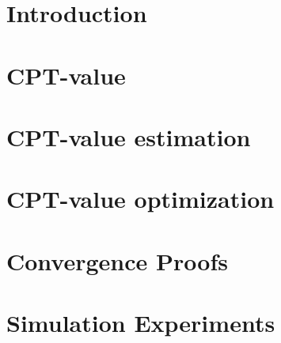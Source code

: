 \documentclass[twocolumn]{IEEEtran}
\begin{document}
\section{Introduction}
\label{sec:introduction}



\section{CPT-value}
\label{sec:cpt-val}




\section{CPT-value estimation} 
\label{sec:cpt-sampling}



\section{CPT-value optimization}
\label{sec:cpt-control}



\section{Convergence Proofs}
\label{sec:convergence}

\section{Simulation Experiments}
\label{sec:expts}
\end{document}
